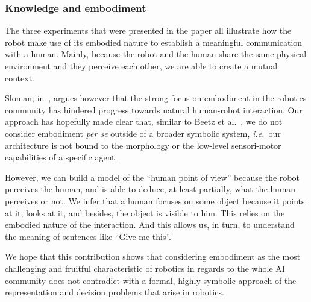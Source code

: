 \documentclass[twocolumn]{svjour3}
\newcommand{\ie}{{\textit{i.e.~}}}
\begin{document}
\subsubsection{Knowledge and embodiment}

The three experiments that were presented in the paper all illustrate how the
robot make use of its embodied nature to establish a meaningful communication
with a human. Mainly, because the robot and the human share the same physical
environment and they perceive each other, we are able to create a mutual
context.

Sloman, in~\cite{Sloman2009}, argues however that the strong focus on
embodiment in the robotics community has hindered progress towards natural
human-robot interaction. Our approach has hopefully made clear that, similar to
Beetz et al.~\cite{Beetz2010}, we do not consider embodiment \emph{per se} outside of
a broader symbolic system, \ie our architecture is not bound to the morphology or
the low-level sensori-motor capabilities of a specific agent. 

However, we can build a model of the ``human point of view'' because the robot
perceives the human, and is able to deduce, at least partially, what the human
perceives or not. We infer that a human focuses on some object because it points at it, looks at it, and besides, the object is visible to him. This relies on the embodied
nature of the interaction. And this allows us, in turn, to understand the
meaning of sentences like ``Give me this''.

We hope that this contribution shows that considering embodiment as the most
challenging and fruitful characteristic of robotics in regards to the whole AI
community does not contradict with a formal, highly symbolic approach of the
representation and decision problems that arise in robotics. 
\end{document}
